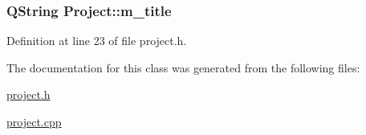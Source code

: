\subsubsection[{m\+\_\+title}]{\setlength{\rightskip}{0pt plus 5cm}Q\+String Project\+::m\+\_\+title\hspace{0.3cm}{\ttfamily [protected]}}\label{class_project_ac195bf7656682a495a15cc18355daf72}


Definition at line 23 of file project.\+h.



The documentation for this class was generated from the following files\+:\begin{DoxyCompactItemize}
\item 
\hyperlink{project_8h}{project.\+h}\item 
\hyperlink{project_8cpp}{project.\+cpp}\end{DoxyCompactItemize}
